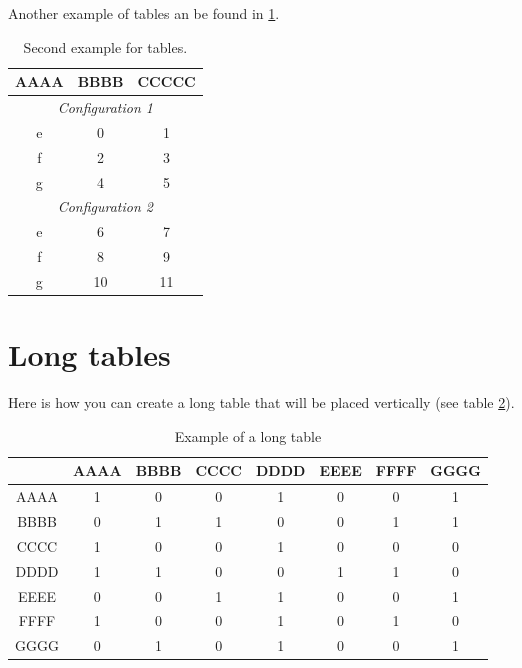 Another example of tables an be found in \ref{tab:Example2}.

\begin{table}[H]
\begin{center}
%
\caption{Second example for tables.}
\label{tab:Example2}
%
\begin{tabular*}{0.4\textwidth}{@{\extracolsep{\fill}}ccc}
%
\toprule
\toprule
%
\textbf{AAAA} & \textbf{BBBB} & \textbf{CCCCC} \\
%
\midrule
\multicolumn{3}{c}{\textit{Configuration 1}}\\
\midrule
e & 0 & 1 \\
f & 2 & 3 \\
g & 4 & 5 \\
%
\midrule
\multicolumn{3}{c}{\textit{Configuration 2}}\\
\midrule
e & 6 & 7 \\
f & 8 & 9 \\
g & 10 & 11 \\
%
\bottomrule
\bottomrule
%
\end{tabular*}
%
\end{center}
\end{table}

\section{Long tables}

Here is how you can create a long table that will be placed vertically (see table \ref{tab:LongTable}).

\begin{landscape}
%
\begin{table}[H]
\begin{center}
%
\caption{Example of a long table}
\label{tab:LongTable}
%
\begin{tabular*}{0.9\linewidth}{@{\extracolsep{\fill}}cccccccc}

%
\toprule
\toprule
%
 & \textbf{AAAA} & \textbf{BBBB} & \textbf{CCCC} & \textbf{DDDD} & \textbf{EEEE} & \textbf{FFFF} & \textbf{GGGG} \\
%
\midrule
%
AAAA & 1 & 0 & 0 & 1 & 0 & 0 & 1 \\
BBBB & 0 & 1 & 1 & 0 & 0 & 1 & 1 \\
CCCC & 1 & 0 & 0 & 1 & 0 & 0 & 0 \\
DDDD & 1 & 1 & 0 & 0 & 1 & 1 & 0 \\
EEEE & 0 & 0 & 1 & 1 & 0 & 0 & 1 \\
FFFF & 1 & 0 & 0 & 1 & 0 & 1 & 0 \\
GGGG & 0 & 1 & 0 & 1 & 0 & 0 & 1 \\
%
\bottomrule
\bottomrule
%
\end{tabular*}
%
\end{center}
\end{table}
%
\end{landscape}

